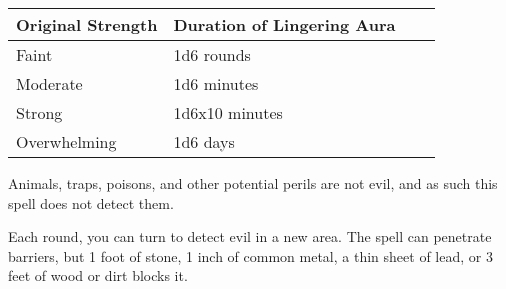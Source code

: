 \begin{longtable}{llll}
\hline
\multicolumn{1}{|p{1.203in}|}{\begin{minipage}[t]{1.203in}\raggedright
\textbf{Original Strength}\end{minipage}} & \multicolumn{1}{p{1.806in}|}{\begin{minipage}[t]{1.806in}\raggedright
\textbf{Duration of Lingering Aura}\end{minipage}}\\
\hline
\multicolumn{1}{p{0.069in}|}{\begin{minipage}[t]{0.069in}\raggedright
Faint\end{minipage}} & \multicolumn{1}{p{0.069in}|}{\begin{minipage}[t]{0.069in}\raggedright
1d6 rounds\end{minipage}}\\
\hline
\multicolumn{1}{|p{1.203in}|}{\begin{minipage}[t]{1.203in}\raggedright
Moderate \end{minipage}} & \multicolumn{1}{p{1.806in}|}{\begin{minipage}[t]{1.806in}\raggedright
1d6 minutes\end{minipage}}\\
\hline
\multicolumn{1}{p{0.069in}|}{\begin{minipage}[t]{0.069in}\raggedright
Strong\end{minipage}} & \multicolumn{1}{p{0.069in}|}{\begin{minipage}[t]{0.069in}\raggedright
1d6x10 minutes\end{minipage}}\\
\hline
\multicolumn{1}{|p{1.203in}|}{\begin{minipage}[t]{1.203in}\raggedright
Overwhelming\end{minipage}} & \multicolumn{3}{p{1.944in}|}{\begin{minipage}[t]{1.944in}\raggedright
1d6 days\end{minipage}}\\
\hline
\end{longtable}

Animals, traps, poisons, and other potential perils are not evil, and as such this 
spell does not detect them.

Each round, you can turn to detect evil in a new area. The spell can penetrate 
barriers, but 1 foot of stone, 1 inch of common metal, a thin sheet of lead, or 
3 feet of wood or dirt blocks it.


